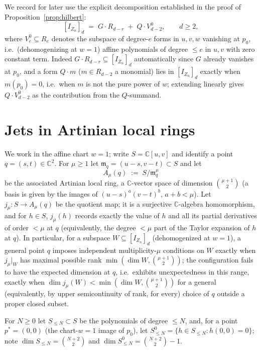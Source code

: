 \documentclass[11pt]{amsart}
\theoremstyle{plain}
\theoremstyle{definition}
\newcommand{\CC}{\mathbb{C}}
\newcommand{\mfrak}{\mathfrak{m}}
\begin{document}
We record for later use the explicit decomposition established in the proof of Proposition~\ref{prop:hilbert}:
\begin{equation}\label{eq:decomp}
[I_{Z_n}]_d \;=\; G\cdot R_{d-r} \;+\; Q\cdot V^0_{d-2}, \qquad d\ge2,
\end{equation}
where $V^0_e\subseteq R_e$ denotes the subspace of degree-$e$ forms in $u,v,w$ vanishing at $p_0$, i.e.\ (dehomogenizing at $w=1$) affine polynomials of degree $\le e$ in $u,v$ with zero constant term. Indeed $G\cdot R_{d-r}\subseteq [I_{Z_n}]_d$ automatically since $G$ already vanishes at $p_0$, and a form $Q\cdot m$ ($m\in R_{d-2}$ a monomial) lies in $[I_{Z_n}]_d$ exactly when $m(p_0)=0$, i.e.\ when $m$ is not the pure power of $w$; extending linearly gives $Q\cdot V^0_{d-2}$ as the contribution from the $Q$-summand.

\section{Jets in Artinian local rings}\label{sec:jets}

We work in the affine chart $w=1$; write $S=\CC[u,v]$ and identify a point $q=(s,t)\in\CC^2$. For $\mu\ge1$ let $\mfrak_q=(u-s,v-t)\subset S$ and let
\[
A_\mu(q) \;:=\; S/\mfrak_q^{\mu}
\]
be the associated Artinian local ring, a $\CC$-vector space of dimension $\binom{\mu+1}{2}$ (a basis is given by the images of $(u-s)^a(v-t)^b$, $a+b<\mu$). Let $j_\mu : S \to A_\mu(q)$ be the quotient map; it is a surjective $\CC$-algebra homomorphism, and for $h\in S$, $j_\mu(h)$ records exactly the value of $h$ and all its partial derivatives of order $<\mu$ at $q$ (equivalently, the degree $<\mu$ part of the Taylor expansion of $h$ at $q$). In particular, for a subspace $W\subseteq [I_{Z_n}]_d$ (dehomogenized at $w=1$), a general point $q$ imposes independent multiplicity-$\mu$ conditions on $W$ exactly when $j_\mu|_W$ has maximal possible rank $\min(\dim W,\binom{\mu+1}{2})$; the configuration fails to have the expected dimension at $q$, i.e.\ exhibits unexpectedness in this range, exactly when $\dim j_\mu(W) < \min(\dim W, \binom{\mu+1}2)$ for a general (equivalently, by upper semicontinuity of rank, for every) choice of $q$ outside a proper closed subset.

For $N\ge0$ let $S_{\le N}\subset S$ be the polynomials of degree $\le N$, and, for a point $p^*=(0,0)$ (the chart-$w=1$ image of $p_0$), let $S^0_{\le N}=\{h\in S_{\le N} : h(0,0)=0\}$; note $\dim S_{\le N}=\binom{N+2}{2}$ and $\dim S^0_{\le N}=\binom{N+2}{2}-1$.
\end{document}
